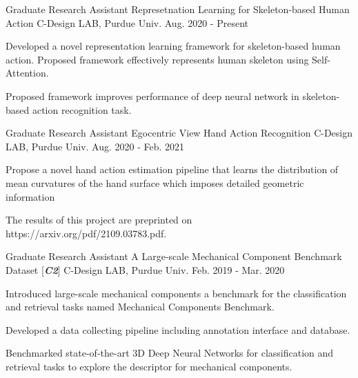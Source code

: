 

\begin{cventries}

\cventry
{Graduate Research Assistant} %
{Represetnation Learning for Skeleton-based Human Action} %
{C-Design LAB, Purdue Univ.} %
{Aug. 2020 - Present} %
{ %
\begin{cvitems}
\item {Developed a novel representation learning framework for skeleton-based human action. Proposed framework effectively represents human skeleton using Self-Attention.}
\item {Proposed framework improves performance of deep neural network in skeleton-based action recognition task.}
\end{cvitems}
}

\cventry
{Graduate Research Assistant} %
{Egocentric View Hand Action Recognition} %
{C-Design LAB, Purdue Univ.} %
{Aug. 2020 - Feb. 2021} %
{ %
\begin{cvitems}
\item {Propose a novel hand action estimation pipeline that learns the distribution of mean curvatures of the hand surface which imposes detailed geometric information}
\item {The results of this project are preprinted on https://arxiv.org/pdf/2109.03783.pdf.}
\end{cvitems}
}

\cventry
{Graduate Research Assistant} %
{A Large-scale Mechanical Component Benchmark Dataset [\textit{\textbf{C2}}]} %
{C-Design LAB, Purdue Univ.} %
{Feb. 2019 - Mar. 2020} %
{ %
\begin{cvitems}
\item {Introduced large-scale mechanical components a benchmark for the classification and retrieval tasks named Mechanical Components Benchmark.}
\item {Developed a data collecting pipeline including annotation interface and database.}
\item {Benchmarked state-of-the-art 3D Deep Neural Networks for classification and retrieval tasks to explore the descriptor for mechanical components.}
\end{cvitems}
}


\end{cventries}
